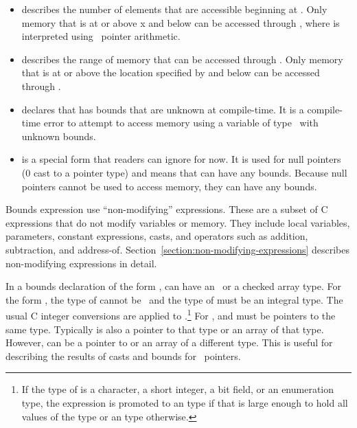 \begin{itemize}
\item
   describes the number of
  elements that are accessible beginning at . Only memory that
  is at or above x and below  \code{+}  can be
  accessed through , where  \code{+}  is
  interpreted using \arrayptr\ pointer arithmetic.
\item
  describes the range of memory that can be accessed through .
  Only memory that is at or above the location specified by 
  and below  can be accessed through .
\item
   declares that  has bounds that
   are unknown at compile-time.
  It is a compile-time error to attempt to access memory using a
  variable of type \arrayptr\ with unknown bounds.
\item
   is a special form that readers can
  ignore for now. It is used for null pointers (0 cast to a pointer
  type) and means that  can have any bounds. Because null
  pointers cannot be used to access memory, they can have any bounds.
\end{itemize}

Bounds expression use ``non-modifying'' expressions. These are a subset
of C expressions that do not modify variables or memory. They include
local variables, parameters, constant expressions, casts, and operators
such as addition, subtraction, and address-of. 
Section~\ref{section:non-modifying-expressions}  describes
non-modifying expressions in detail.

In a bounds declaration of the form ,
 can have an \arrayptr\ or a checked array type.
For the form  ,  the type of
 cannot be \arrayptrvoid\ and the type of  must be an integral type.
The usual C integer conversions are applied to .\footnote{If the
type of  is a character, a short integer, a bit field, or an enumeration type,
the expression is promoted to an  type if that is large
enough to  hold all values of the type or an  type otherwise.}
For ,  and
 must be pointers to the same type.  Typically  is also 
a pointer to that type or an array of that type.  
However,  can be a pointer to or an array of a different type.
This is useful for describing the results of casts and
bounds for \arrayptrvoid\ pointers.

